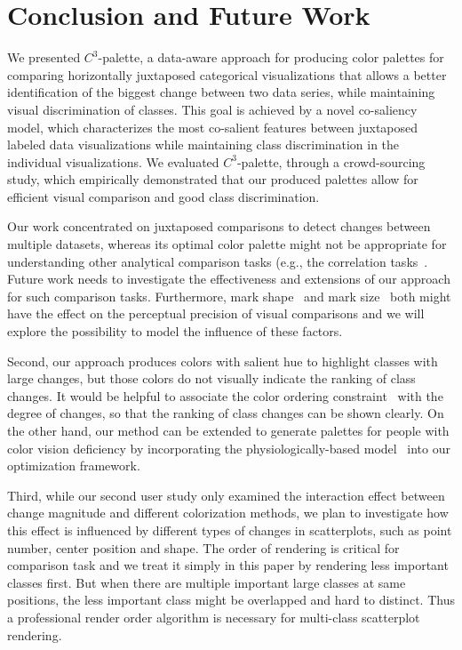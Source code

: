 \section {Conclusion and Future Work}
We presented $C^3$-palette, a data-aware approach for producing color
palettes for comparing horizontally juxtaposed categorical visualizations that allows a better identification of the biggest change between two data series, while maintaining visual discrimination of classes. This goal is
achieved by a  novel co-saliency model, which characterizes the most co-salient features between juxtaposed labeled data visualizations while maintaining class discrimination in the individual visualizations. We evaluated $C^3$-palette, through a
crowd-sourcing study, which empirically demonstrated that our produced
palettes allow for efficient visual comparison and good class discrimination.




Our work concentrated on juxtaposed comparisons to detect changes between multiple datasets, whereas its optimal color palette might not be appropriate for understanding other analytical comparison tasks (e.g., the correlation tasks~\cite{Ondov19}. Future work needs to investigate the effectiveness and extensions of our approach for such comparison tasks. Furthermore, mark shape~\cite{liu2021data} and mark size~\cite{smart2019measuring} both might have the effect on the perceptual precision of visual comparisons and we will explore the possibility to model the influence of these factors. %


Second, our approach produces colors with salient hue to highlight classes with large changes, but those colors do not visually indicate the ranking of class changes. It would be helpful to associate the color ordering constraint~\cite{Bujack18} with the degree of changes, so that the ranking of class changes can be shown clearly. On the other hand, our method can be extended to generate palettes for people with color vision deficiency by incorporating the physiologically-based model~\cite{machado2009physiologically} into our optimization framework.


Third, while our second user study only examined the interaction effect between change magnitude and different colorization methods, we plan to investigate how this effect is influenced by different types of changes in scatterplots, such as point number, center position and shape.
The order of rendering is critical for comparison task and we treat it simply in this paper by rendering less important classes first. But when there are multiple important large classes at same positions, the less important class might be overlapped and hard to distinct. Thus a professional render order algorithm is necessary for multi-class scatterplot rendering.

